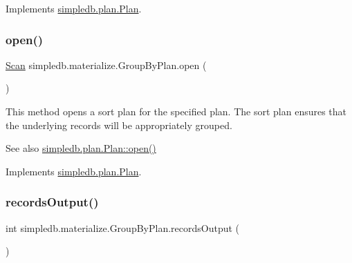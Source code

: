 Implements \hyperlink{interfacesimpledb_1_1plan_1_1Plan_a55094c16c756b0c09b5c71b94d573271}{simpledb.\+plan.\+Plan}.

\mbox{\label{classsimpledb_1_1materialize_1_1GroupByPlan_a2f4aa5e9b356af297091a27ff2b97343}} 
\subsubsection{\texorpdfstring{open()}{open()}}
{\footnotesize\ttfamily \hyperlink{interfacesimpledb_1_1query_1_1Scan}{Scan} simpledb.\+materialize.\+Group\+By\+Plan.\+open (\begin{DoxyParamCaption}{ }\end{DoxyParamCaption})\hspace{0.3cm}{\ttfamily [inline]}}

This method opens a sort plan for the specified plan. The sort plan ensures that the underlying records will be appropriately grouped. \begin{DoxySeeAlso}{See also}
\hyperlink{interfacesimpledb_1_1plan_1_1Plan_aaa4c15cda4e9c0d52308850f9f13ff99}{simpledb.\+plan.\+Plan\+::open()} 
\end{DoxySeeAlso}


Implements \hyperlink{interfacesimpledb_1_1plan_1_1Plan_aaa4c15cda4e9c0d52308850f9f13ff99}{simpledb.\+plan.\+Plan}.

\mbox{\label{classsimpledb_1_1materialize_1_1GroupByPlan_aac232f69ae5b322754b34f83c4813883}} 
\subsubsection{\texorpdfstring{records\+Output()}{recordsOutput()}}
{\footnotesize\ttfamily int simpledb.\+materialize.\+Group\+By\+Plan.\+records\+Output (\begin{DoxyParamCaption}{ }\end{DoxyParamCaption})\hspace{0.3cm}{\ttfamily [inline]}}

